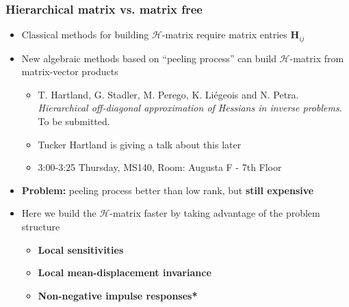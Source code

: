 \documentclass[10pt,final,xcolor=dvipsnames]{beamer}
\begin{document}
\begin{frame}
	\frametitle{Hierarchical matrix vs. matrix free}
	\begin{itemize}
		\setlength\itemsep{1.5em}
		\item Classical methods for building $\mathcal{H}$-matrix require matrix entries $\mathbf{H}_{ij}$ 
		\item New algebraic methods based on ``peeling process'' can build $\mathcal{H}$-matrix from matrix-vector products
		\begin{itemize}
			\item {\scriptsize T. Hartland, G. Stadler, M. Perego, K. Li\'{e}geois and N. Petra. \emph{Hierarchical off-diagonal approximation of Hessians in inverse problems}. To be submitted.}
			\item Tucker Hartland is giving a talk about this later
			\item 3:00-3:25 Thursday, MS140, Room: Augusta F - 7th Floor
		\end{itemize} 
		\item \textbf{Problem:} peeling process better than low rank, but \textbf{still expensive}
		\item Here we build the $\mathcal{H}$-matrix faster by taking advantage of the problem structure
		\begin{itemize}
			\item \textbf{Local sensitivities}
			\item \textbf{Local mean-displacement invariance}
			\item \textbf{Non-negative impulse responses*}
		\end{itemize}
	\end{itemize}
\end{frame}

%
%
%
\end{document}
